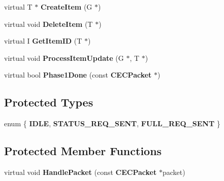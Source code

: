 \begin{DoxyCompactItemize}
\item 
virtual T $\ast$ {\bfseries CreateItem} (G $\ast$)\label{classCRemoteContainer_a3cab4b191dcf5779f111d1d7508f8b32}

\item 
virtual void {\bfseries DeleteItem} (T $\ast$)\label{classCRemoteContainer_aad9857b6f4dc2415721ae4145745cd2c}

\item 
virtual I {\bfseries GetItemID} (T $\ast$)\label{classCRemoteContainer_a1da2f4f24ad32a8a913381cf328aa5dc}

\item 
virtual void {\bfseries ProcessItemUpdate} (G $\ast$, T $\ast$)\label{classCRemoteContainer_a0dfd94d9183d4e09108c752346ed17e7}

\item 
virtual bool {\bfseries Phase1Done} (const {\bf CECPacket} $\ast$)\label{classCRemoteContainer_ad199bba867b4a9731e8520ea67a1b24f}

\end{DoxyCompactItemize}
\subsection*{Protected Types}
\begin{DoxyCompactItemize}
\item 
enum \{ {\bfseries IDLE}, 
{\bfseries STATUS\_\-REQ\_\-SENT}, 
{\bfseries FULL\_\-REQ\_\-SENT}
 \}
\end{DoxyCompactItemize}
\subsection*{Protected Member Functions}
\begin{DoxyCompactItemize}
\item 
virtual void {\bfseries HandlePacket} (const {\bf CECPacket} $\ast$packet)\label{classCRemoteContainer_a3751674b5d73f91fdbd9b10969fc5792}

\end{DoxyCompactItemize}
